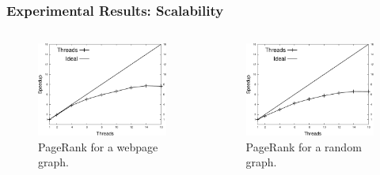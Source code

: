 \documentclass{beamer}
\begin{document}
\begin{frame}[fragile]
   \frametitle{Experimental Results: Scalability}
   \begin{columns}[t]
      \begin{figure}[b]
         \includegraphics[width=\textwidth]{../speedup_pagerank-search_engines.pdf}
         \caption{PageRank for a webpage graph.}
      \end{figure}
      \begin{figure}[b]
         \includegraphics[width=\textwidth]{../speedup_pagerank-5000.pdf}
         \caption{PageRank for a random graph.}
      \end{figure}
   \end{columns}
\end{frame}
\end{document}

